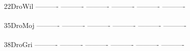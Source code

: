 \documentclass[11pt,twoside,reqno,a4paper]{article}
\begin{document}
{\hspace*{5\charwidth}\hspace*{7\charwidth}\hspace*{1\charwidth}\hspace*{1\charwidth}\hspace*{1\charwidth}\hspace*{1\charwidth}\hspace*{1\charwidth}\hspace*{1\charwidth}\\
22\hspace*{3\charwidth}DroWil	----------	----------	----------	----------	----------	----------	\\
\hspace*{5\charwidth}\hspace*{7\charwidth}\hspace*{1\charwidth}\hspace*{1\charwidth}\hspace*{1\charwidth}\hspace*{1\charwidth}\hspace*{1\charwidth}\hspace*{1\charwidth}\\
35\hspace*{3\charwidth}DroMoj	----------	----------	----------	----------	----------	----------	\\
\hspace*{5\charwidth}\hspace*{7\charwidth}\hspace*{1\charwidth}\hspace*{1\charwidth}\hspace*{1\charwidth}\hspace*{1\charwidth}\hspace*{1\charwidth}\hspace*{1\charwidth}\\
38\hspace*{3\charwidth}DroGri	----------	----------	----------	----------	----------	----------	\\
\hspace*{5\charwidth}\hspace*{7\charwidth}\hspace*{1\charwidth}\hspace*{1\charwidth}\hspace*{1\charwidth}\hspace*{1\charwidth}\hspace*{1\charwidth}\hspace*{1\charwidth}\\
}
\end{document}
